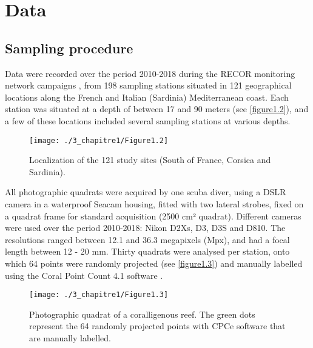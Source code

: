\section{Data}\label{chapitre1_3}

\subsection{Sampling procedure}\label{chapitre1_3.1}
Data were recorded over the period 2010-2018 during the RECOR monitoring network campaigns \citep{andromede-oceanologie_recor_2018}, from 198 sampling stations situated in 121 geographical locations along the French and Italian (Sardinia) Mediterranean coast. Each station was situated at a depth of between 17 and 90 meters (see \autoref{figure1.2}), and a few of these locations included several sampling stations at various depths. 

\begin{figure}[H]
	\begin{center}
	\texttt{[image: ./3\_chapitre1/Figure1.2]}
		\caption{Localization of the 121 study sites (South of France, Corsica and Sardinia).}
	\label{figure1.2}
\end{center}
\end{figure}

All photographic quadrats were acquired by one scuba diver, using a DSLR camera in a waterproof Seacam housing, fitted with two lateral strobes, fixed on a quadrat frame for standard acquisition (2500 cm² quadrat). Different cameras were used over the period 2010-2018: Nikon D2Xs, D3, D3S and D810. The resolutions ranged between 12.1 and 36.3 megapixels (Mpx), and had a focal length between 12 - 20 mm. Thirty quadrats were analysed per station, onto which 64 points were randomly projected (see \autoref{figure1.3}) and manually labelled using the Coral Point Count 4.1 \citep{cpce_coral_2011} software \citep{deter_rapid_2012}. 

\begin{figure}[H]
	\begin{center}
	\texttt{[image: ./3\_chapitre1/Figure1.3]}
		\caption[Photographic quadrat of a coralligenous reef]{Photographic quadrat of a coralligenous reef. The green dots represent the 64 randomly projected points with CPCe software that are manually labelled.}
	\label{figure1.3}
\end{center}
\end{figure}

